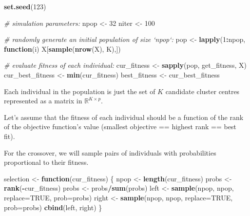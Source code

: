 \documentclass[10pt,b5paper,krantz1]{krantz}
\newenvironment{Shaded}{\begin{snugshade}}{\end{snugshade}}
\newcommand{\CommentTok}[1]{\textcolor[rgb]{0.37,0.37,0.37}{\textit{#1}}}
\newcommand{\ControlFlowTok}[1]{\textcolor[rgb]{0.27,0.27,0.27}{\textbf{#1}}}
\newcommand{\DataTypeTok}[1]{\textcolor[rgb]{0.27,0.27,0.27}{#1}}
\newcommand{\DecValTok}[1]{\textcolor[rgb]{0.06,0.06,0.06}{#1}}
\newcommand{\KeywordTok}[1]{\textcolor[rgb]{0.27,0.27,0.27}{\textbf{#1}}}
\newcommand{\NormalTok}[1]{#1}
\newcommand{\OperatorTok}[1]{\textcolor[rgb]{0.43,0.43,0.43}{\textbf{#1}}}
\newcommand{\OtherTok}[1]{\textcolor[rgb]{0.37,0.37,0.37}{#1}}
\newcommand{\StringTok}[1]{\textcolor[rgb]{0.5,0.5,0.5}{#1}}
\begin{document}
\begin{Shaded}
\begin{Highlighting}[]
\KeywordTok{set.seed}\NormalTok{(}\DecValTok{123}\NormalTok{)}

\CommentTok{# simulation parameters:}
\NormalTok{npop <-}\StringTok{ }\DecValTok{32}
\NormalTok{niter <-}\StringTok{ }\DecValTok{100}

\CommentTok{# randomly generate an initial population of size `npop`:}
\NormalTok{pop <-}\StringTok{ }\KeywordTok{lapply}\NormalTok{(}\DecValTok{1}\OperatorTok{:}\NormalTok{npop, }\ControlFlowTok{function}\NormalTok{(i) X[}\KeywordTok{sample}\NormalTok{(}\KeywordTok{nrow}\NormalTok{(X), K),])}

\CommentTok{# evaluate fitness of each individual:}
\NormalTok{cur_fitness <-}\StringTok{ }\KeywordTok{sapply}\NormalTok{(pop, get_fitness, X)}
\NormalTok{cur_best_fitness <-}\StringTok{ }\KeywordTok{min}\NormalTok{(cur_fitness)}
\NormalTok{best_fitness <-}\StringTok{ }\NormalTok{cur_best_fitness}
\end{Highlighting}
\end{Shaded}

Each individual in the population is just the set of \(K\)
candidate cluster centres represented as a matrix in \(\mathbb{R}^{K\times p}\).

Let's assume that the fitness of each individual should be a function of
the rank of the objective function's value
(smallest objective == highest rank == best fit).

For the crossover, we will sample pairs of individuals with
probabilities proportional to their fitness.

\begin{Shaded}
\begin{Highlighting}[]
\NormalTok{selection <-}\StringTok{ }\ControlFlowTok{function}\NormalTok{(cur_fitness) \{}
\NormalTok{    npop <-}\StringTok{ }\KeywordTok{length}\NormalTok{(cur_fitness)}
\NormalTok{    probs <-}\StringTok{ }\KeywordTok{rank}\NormalTok{(}\OperatorTok{-}\NormalTok{cur_fitness)}
\NormalTok{    probs <-}\StringTok{ }\NormalTok{probs}\OperatorTok{/}\KeywordTok{sum}\NormalTok{(probs)}
\NormalTok{    left  <-}\StringTok{ }\KeywordTok{sample}\NormalTok{(npop, npop, }\DataTypeTok{replace=}\OtherTok{TRUE}\NormalTok{, }\DataTypeTok{prob=}\NormalTok{probs)}
\NormalTok{    right <-}\StringTok{ }\KeywordTok{sample}\NormalTok{(npop, npop, }\DataTypeTok{replace=}\OtherTok{TRUE}\NormalTok{, }\DataTypeTok{prob=}\NormalTok{probs)}
    \KeywordTok{cbind}\NormalTok{(left, right)}
\NormalTok{\}}
\end{Highlighting}
\end{Shaded}
\end{document}
